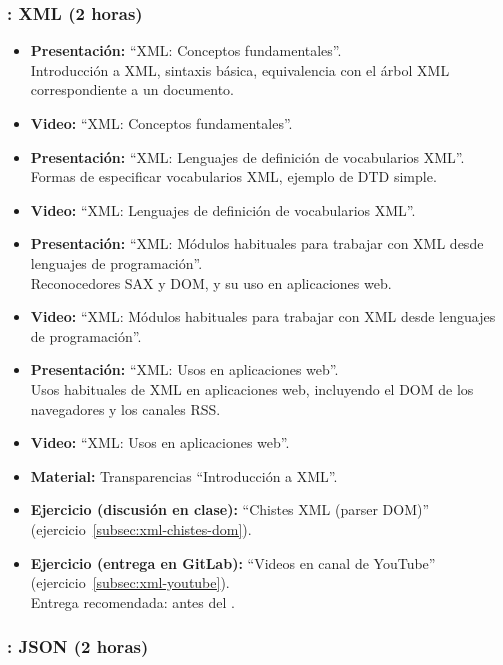 \documentclass[a4paper,12pt]{article}
\begin{document}
\subsubsection{\martesI: XML (2 horas)}
\label{cal:martesI}

\begin{itemize}
\item \textbf{Presentación:} ``XML: Conceptos fundamentales''. \\
  Introducción a XML, sintaxis básica, equivalencia con el árbol XML correspondiente a un documento.
\item \textbf{Video:} ``XML: Conceptos fundamentales''.

\item \textbf{Presentación:} ``XML: Lenguajes de definición de vocabularios XML''. \\
  Formas de especificar vocabularios XML, ejemplo de DTD simple.
\item \textbf{Video:} ``XML: Lenguajes de definición de vocabularios XML''.
\item \textbf{Presentación:} ``XML: Módulos habituales para trabajar con XML desde lenguajes de programación''. \\
  Reconocedores SAX y DOM, y su uso en aplicaciones web.
\item \textbf{Video:} ``XML: Módulos habituales para trabajar con XML desde lenguajes de programación''.
\item \textbf{Presentación:} ``XML: Usos en aplicaciones web''. \\
  Usos habituales de XML en aplicaciones web, incluyendo el DOM de los navegadores y los canales RSS.
\item \textbf{Video:} ``XML: Usos en aplicaciones web''.
\item \textbf{Material:} Transparencias ``Introducción a XML''.
\item \textbf{Ejercicio (discusión en clase):} ``Chistes XML (parser DOM)'' (ejercicio~\ref{subsec:xml-chistes-dom}).
\item \textbf{Ejercicio (entrega en GitLab):} ``Videos en canal de YouTube'' (ejercicio~\ref{subsec:xml-youtube}).\\
  Entrega recomendada: antes del \martesJ.

\end{itemize}

\subsubsection{\martesJ: JSON (2 horas)}
\label{cal:martesJ}
\end{document}
